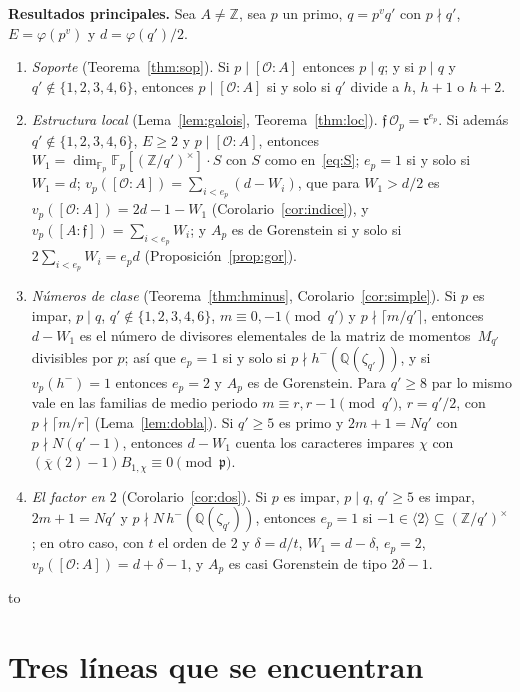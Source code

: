 \documentclass[11pt,a4paper]{article}
\theoremstyle{definition}
\newcommand{\ZZ}{\mathbb{Z}}
\newcommand{\QQ}{\mathbb{Q}}
\newcommand{\FF}{\mathbb{F}}
\newcommand{\cO}{\mathcal{O}}
\newcommand{\cf}{\mathfrak{f}}
\newcommand{\rad}{\mathfrak{r}}
\newenvironment{keybox}
  {\par\vspace{9pt}\begin{lrbox}{\fichabox}%
   \begin{minipage}{0.90\textwidth}\vspace{7pt}\setlength{\parskip}{3pt}}
  {\vspace{7pt}\end{minipage}\end{lrbox}%
   \par\needspace{\dimexpr\ht\fichabox+\dp\fichabox+12pt\relax}\noindent\hbox to \textwidth{\hfill
   \textcolor{azul}{\rule[-\dp\fichabox]{3.2pt}{\dimexpr\ht\fichabox+\dp\fichabox\relax}}%
   \colorbox{fondoficha}{\usebox{\fichabox}}\hfill}%
   \par\vspace{9pt}}
\begin{document}
\begin{keybox}
\noindent\textbf{Resultados principales.} Sea $A\ne\ZZ$, sea $p$ un primo, $q=p^vq'$ con $p\nmid q'$, $E=\varphi(p^v)$ y
$d=\varphi(q')/2$.
\begin{enumerate}
\item[(1)] \emph{Soporte} (Teorema~\ref{thm:sop}). Si $p\mid[\cO:A]$ entonces $p\mid q$; y si $p\mid q$ y
 $q'\notin\{1,2,3,4,6\}$, entonces $p\mid[\cO:A]$ si y solo si $q'$ divide a $h$, $h+1$ o $h+2$.
\item[(2)] \emph{Estructura local} (Lema~\ref{lem:galois}, Teorema~\ref{thm:loc}). $\cf\,\cO_p=\rad^{e_p}$. Si además
 $q'\notin\{1,2,3,4,6\}$, $E\ge2$ y $p\mid[\cO:A]$, entonces $W_1=\dim_{\FF_p}\FF_p[(\ZZ/q')^\times]\cdot S$ con $S$ como en~\eqref{eq:S}; $e_p=1$ si
 y solo si $W_1=d$; $v_p([\cO:A])=\sum_{i<e_p}(d-W_i)$, que para $W_1>d/2$ es $v_p([\cO:A])=2d-1-W_1$
 (Corolario~\ref{cor:indice}), y $v_p([A:\cf])=\sum_{i<e_p}W_i$; y $A_p$ es de
 Gorenstein si y solo si $2\sum_{i<e_p}W_i=e_pd$ (Proposición~\ref{prop:gor}).
\item[(3)] \emph{Números de clase} (Teorema~\ref{thm:hminus}, Corolario~\ref{cor:simple}). Si $p$ es impar, $p\mid q$,
 $q'\notin\{1,2,3,4,6\}$, $m\equiv0,-1\pmod{q'}$ y $p\nmid\lceil m/q'\rceil$, entonces $d-W_1$ es el
 número de divisores elementales de la matriz de momentos~$M_{q'}$ divisibles por $p$; así que $e_p=1$ si y solo si
 $p\nmid h^-(\QQ(\zeta_{q'}))$, y si $v_p(h^-)=1$ entonces $e_p=2$ y $A_p$ es de Gorenstein. Para $q'\ge8$ par lo mismo vale
 en las familias de medio periodo $m\equiv r,r-1\pmod{q'}$, $r=q'/2$, con $p\nmid\lceil m/r\rceil$ (Lema~\ref{lem:dobla}). Si $q'\ge5$ es primo y
 $2m+1=Nq'$ con $p\nmid N(q'-1)$, entonces $d-W_1$ cuenta los caracteres impares $\chi$ con $(\overline\chi(2)-1)B_{1,\chi}\equiv0\pmod{\mathfrak p}$.
\item[(4)] \emph{El factor en $2$} (Corolario~\ref{cor:dos}). Si $p$ es impar, $p\mid q$, $q'\ge5$ es impar, $2m+1=Nq'$ y
 $p\nmid N\,h^-(\QQ(\zeta_{q'}))$, entonces $e_p=1$ si $-1\in\langle2\rangle\subseteq(\ZZ/q')^\times$; en otro caso, con $t$ el
 orden de $2$ y $\delta=d/t$, $W_1=d-\delta$, $e_p=2$, $v_p([\cO:A])=d+\delta-1$, y $A_p$ es casi Gorenstein de
 tipo $2\delta-1$.
\end{enumerate}
\end{keybox}

\section{Tres líneas que se encuentran}\label{sec:historia}
\end{document}
